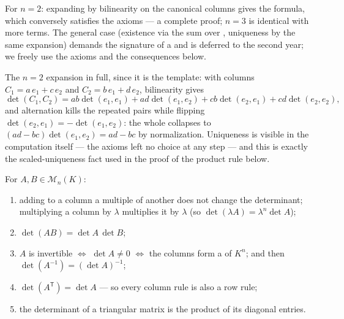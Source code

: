 \begin{remark}
For $n = 2$: expanding by bilinearity on the canonical columns gives
the formula, which conversely satisfies the axioms --- a complete
proof; $n = 3$ is identical with more terms. The general case
(existence via the sum over , uniqueness by the same
expansion) demands the signature of a  and is deferred to
the second year; we freely use the axioms and the consequences
below.

The $n = 2$ expansion in full, since it is the template: with
columns $C_1 = a\,e_1 + c\,e_2$ and $C_2 = b\,e_1 + d\,e_2$,
bilinearity gives
\[
\det(C_1, C_2) = ab\det(e_1, e_1) + ad\det(e_1, e_2)
+ cb\det(e_2, e_1) + cd\det(e_2, e_2),
\]
and alternation kills the repeated pairs while flipping
$\det(e_2, e_1) = -\det(e_1, e_2)$: the whole  collapses to
$(ad - bc)\det(e_1, e_2) = ad - bc$ by normalization. Uniqueness
is visible in the computation itself --- the axioms left no
choice at any step --- and this is exactly the scaled-uniqueness
fact used in the proof of the product rule below.
\end{remark}

\begin{theorem}[Properties]\label{thm:b1:det:props}
For $A, B \in \mathcal{M}_n(K)$:
\begin{enumerate}
  \item adding to a column a multiple of another does not change the
        determinant; multiplying a column by $\lambda$ multiplies it
        by $\lambda$ (so $\det(\lambda A) = \lambda^n \det A$);
  \item $\det(AB) = \det A\, \det B$;
  \item $A$ is invertible $\iff$ $\det A \neq 0$ $\iff$ the columns
        form a  of $K^n$; and then $\det(A^{-1}) = (\det
        A)^{-1}$;
  \item $\det(A^{\mathsf T}) = \det A$ --- so every column rule is
        also a row rule;
  \item the determinant of a triangular matrix is the product of its
        diagonal entries.
\end{enumerate}
\end{theorem}

